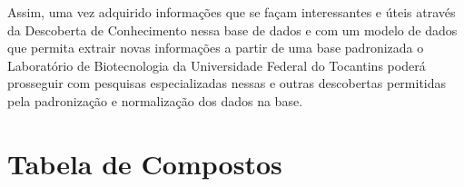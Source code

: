 \documentclass[tcc2]{classe_uftex/uftex}
\begin{document}
Assim, uma vez adquirido informações que se façam interessantes e úteis através da Descoberta de Conhecimento nessa base de dados e com um modelo de dados que permita extrair novas informações a partir de uma base padronizada o Laboratório de Biotecnologia da Universidade Federal do Tocantins poderá prosseguir com pesquisas especializadas nessas e outras descobertas permitidas pela padronização e normalização dos dados na base.


\backmatter 
\singlespacing   


\appendix
\onehalfspacing

\chapter{Tabela de Compostos}
\label{ape:apendice}
\end{document}
